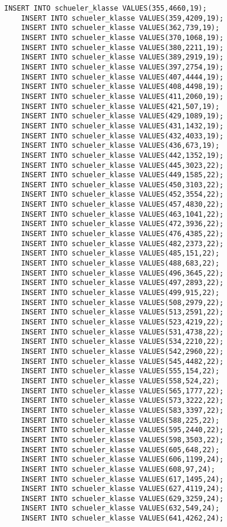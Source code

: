 \begin{lstlisting}[breaklines=True, numbers=none, basicstyle=\tiny, keepspaces=false]
	INSERT INTO schueler_klasse VALUES(355,4660,19);
	INSERT INTO schueler_klasse VALUES(359,4209,19);
	INSERT INTO schueler_klasse VALUES(362,739,19);
	INSERT INTO schueler_klasse VALUES(370,1068,19);
	INSERT INTO schueler_klasse VALUES(380,2211,19);
	INSERT INTO schueler_klasse VALUES(389,2919,19);
	INSERT INTO schueler_klasse VALUES(397,2754,19);
	INSERT INTO schueler_klasse VALUES(407,4444,19);
	INSERT INTO schueler_klasse VALUES(408,4498,19);
	INSERT INTO schueler_klasse VALUES(411,2060,19);
	INSERT INTO schueler_klasse VALUES(421,507,19);
	INSERT INTO schueler_klasse VALUES(429,1089,19);
	INSERT INTO schueler_klasse VALUES(431,1432,19);
	INSERT INTO schueler_klasse VALUES(432,4033,19);
	INSERT INTO schueler_klasse VALUES(436,673,19);
	INSERT INTO schueler_klasse VALUES(442,1352,19);
	INSERT INTO schueler_klasse VALUES(445,3023,22);
	INSERT INTO schueler_klasse VALUES(449,1585,22);
	INSERT INTO schueler_klasse VALUES(450,3103,22);
	INSERT INTO schueler_klasse VALUES(452,3554,22);
	INSERT INTO schueler_klasse VALUES(457,4830,22);
	INSERT INTO schueler_klasse VALUES(463,1041,22);
	INSERT INTO schueler_klasse VALUES(472,3936,22);
	INSERT INTO schueler_klasse VALUES(476,4385,22);
	INSERT INTO schueler_klasse VALUES(482,2373,22);
	INSERT INTO schueler_klasse VALUES(485,151,22);
	INSERT INTO schueler_klasse VALUES(488,683,22);
	INSERT INTO schueler_klasse VALUES(496,3645,22);
	INSERT INTO schueler_klasse VALUES(497,2893,22);
	INSERT INTO schueler_klasse VALUES(499,915,22);
	INSERT INTO schueler_klasse VALUES(508,2979,22);
	INSERT INTO schueler_klasse VALUES(513,2591,22);
	INSERT INTO schueler_klasse VALUES(523,4219,22);
	INSERT INTO schueler_klasse VALUES(531,4738,22);
	INSERT INTO schueler_klasse VALUES(534,2210,22);
	INSERT INTO schueler_klasse VALUES(542,2960,22);
	INSERT INTO schueler_klasse VALUES(545,4482,22);
	INSERT INTO schueler_klasse VALUES(555,154,22);
	INSERT INTO schueler_klasse VALUES(558,524,22);
	INSERT INTO schueler_klasse VALUES(565,1777,22);
	INSERT INTO schueler_klasse VALUES(573,3222,22);
	INSERT INTO schueler_klasse VALUES(583,3397,22);
	INSERT INTO schueler_klasse VALUES(588,225,22);
	INSERT INTO schueler_klasse VALUES(595,2440,22);
	INSERT INTO schueler_klasse VALUES(598,3503,22);
	INSERT INTO schueler_klasse VALUES(605,648,22);
	INSERT INTO schueler_klasse VALUES(606,1199,24);
	INSERT INTO schueler_klasse VALUES(608,97,24);
	INSERT INTO schueler_klasse VALUES(617,1495,24);
	INSERT INTO schueler_klasse VALUES(627,4119,24);
	INSERT INTO schueler_klasse VALUES(629,3259,24);
	INSERT INTO schueler_klasse VALUES(632,549,24);
	INSERT INTO schueler_klasse VALUES(641,4262,24);

\end{lstlisting}
